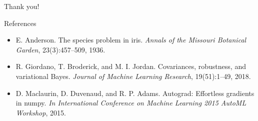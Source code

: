 \documentclass[10pt]{beamer}\usepackage[]{graphicx}\usepackage[]{color}
\begin{document}
\begin{frame}

Thank you!

\end{frame}

\begin{frame}{References}

\begin{itemize}
\item E. Anderson. The species problem in iris. {\itshape Annals of the Missouri Botanical Garden}, 23(3):457–509, 1936.

\item R. Giordano, T. Broderick, and M. I. Jordan. Covariances, robustness, and variational Bayes. {\itshape Journal of Machine Learning Research}, 19(51):1–49, 2018.

\item D. Maclaurin, D. Duvenaud, and R. P. Adams. Autograd: Effortless gradients in numpy. {\itshape In International Conference on Machine Learning 2015 AutoML Workshop}, 2015.

\end{itemize}

\end{frame}
\end{document}
